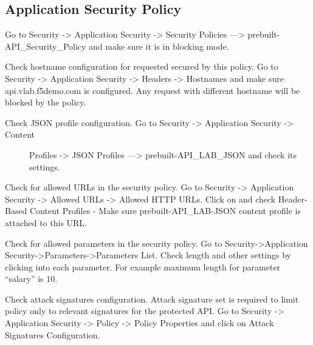 \documentclass[letterpaper,10pt,english]{sphinxmanual}
\begin{document}
\subsection{Application Security Policy}
\label{\detokenize{class2/module2/module2:application-security-policy}}
Go to Security -\textgreater{} Application Security -\textgreater{} Security Policies —\textgreater{} prebuilt-API\_Security\_Policy and make sure it is in blocking mode.
\begin{quote}

\noindent{}
\end{quote}

Check hostname configuration for requested secured by this policy. Go to Security -\textgreater{} Application Security -\textgreater{} Headers -\textgreater{} Hostnames and make sure api.vlab.f5demo.com is configured. Any request with different hostname will be blocked by the policy.

\noindent{}
\begin{description}
\item[{Check JSON profile configuration. Go to Security -\textgreater{} Application Security -\textgreater{} Content}] \leavevmode
Profiles -\textgreater{} JSON Profiles —\textgreater{} prebuilt-API\_LAB\_JSON and check its settings.

\end{description}

\noindent{}

Check for allowed URLs in the security policy. Go to Security -\textgreater{} Application Security -\textgreater{} Allowed URLs -\textgreater{} Allowed HTTP URLs. Click on  and check Header-Based Content Profiles - Make sure prebuilt-API\_LAB-JSON content profile is attached to this URL.

\noindent{}

Check for allowed parameters in the security policy. Go to Security-\textgreater{}Application Security-\textgreater{}Parameters-\textgreater{}Parameters List. Check length and other settings by clicking into each parameter. For example maximum length for parameter “salary” is 10.

\noindent{}

Check attack signatures configuration. Attack signature set is required to limit policy only to relevant signatures for the protected API. Go to Security -\textgreater{} Application Security -\textgreater{} Policy -\textgreater{} Policy Properties and click on Attack Signatures Configuration.
\end{document}

